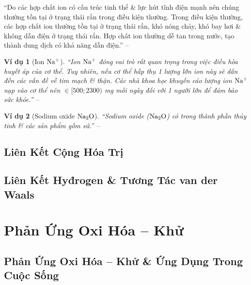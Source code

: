 \documentclass{article}
\numberwithin{equation}{section}
\newtheorem{vidu}{Ví dụ}[section]
\begin{document}
``Do các hợp chất ion có cấu trúc tinh thể \& lực hút tĩnh điện mạnh nên chúng thường tồn tại ở trạng thái rắn trong điều kiện thường. Trong điều kiện thường, các hợp chất ion thường tồn tại ở trạng thái rắn, khó nóng chảy, khó bay hơi \& không dẫn điện ở trạng thái rắn. Hợp chất ion thường dễ tan trong nước, tạo thành dung dịch có khả năng dẫn điện.'' -- \cite[p. 57]{SGK_Hoa_Hoc_10_Chan_Troi_Sang_Tao}

\begin{vidu}[Ion $\rm Na^+$]
	``Ion $\rm Na^+$ đóng vai trò rất quan trọng trong việc điều hòa huyết áp của cơ thể. Tuy nhiên, nếu cơ thể hấp thụ 1 lượng lớn ion này sẽ dẫn đến các vấn đề về tim mạch \& thận. Các nhà khoa học khuyến cáo lượng ion $\rm Na^+$ nạp vào cơ thể nên $\in[500;2300)$ mg mỗi ngày đối với 1 người lớn để đảm bảo sức khỏe.'' -- \cite[p. 57]{SGK_Hoa_Hoc_10_Chan_Troi_Sang_Tao}
\end{vidu}

\begin{vidu}[Sodium oxide $\rm Na_2O$]
	``\emph{Sodium oxide ($\rm Na_2O$)} có trong thành phần thủy tinh \& các sản phẩm gốm sứ.'' -- \cite[p. 58]{SGK_Hoa_Hoc_10_Chan_Troi_Sang_Tao}
\end{vidu}


\subsection{Liên Kết Cộng Hóa Trị}


\subsection{Liên Kết Hyđrogen \& Tương Tác van der Waals}


\section{Phản Ứng Oxi Hóa -- Khử}

\subsection{Phản Ứng Oxi Hóa -- Khử \& Ứng Dụng Trong Cuộc Sống}
\end{document}
